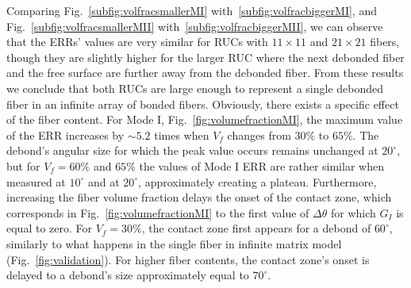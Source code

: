 \documentclass[review]{elsarticle}
\begin{document}
Comparing Fig.~\ref{subfig:volfracsmallerMI} with~\ref{subfig:volfracbiggerMI}, and Fig.~\ref{subfig:volfracsmallerMII} with~\ref{subfig:volfracbiggerMII}, we can observe that the ERRs' values are very similar for RUCs with $11\times11$ and $21\times21$ fibers, though they are slightly higher for the larger RUC where the next debonded fiber and the free surface are further away from the debonded fiber. From these results we conclude that both RUCs are large enough to represent a single debonded fiber in an infinite array of bonded fibers. Obviously, there exists a specific effect of the fiber content. For Mode I, Fig.~\ref{fig:volumefractionMI}, the maximum value of the ERR increases by $\sim 5.2$ times when $V_{f}$ changes from $30\%$ to $65\%$. The debond's angular size for which the peak value occurs remains unchanged at $20^{\circ}$, but for $V_{f}=60\%$ and $65\%$ the values of Mode I ERR are rather similar when measured at $10^{\circ}$ and at $20^{\circ}$, approximately creating a plateau. Furthermore, increasing the fiber volume fraction delays the onset of the contact zone, which corresponds in Fig.~\ref{fig:volumefractionMI} to the first value of $\Delta\theta$ for which $G_{I}$ is equal to zero. For $V_{f}=30\%$, the contact zone first appears for a debond of $60^{\circ}$, similarly to what happens in the single fiber in infinite matrix model (Fig.~\ref{fig:validation}). For higher fiber contents, the contact zone's onset is delayed to a debond's size approximately equal to $70^{\circ}$.
\end{document}
